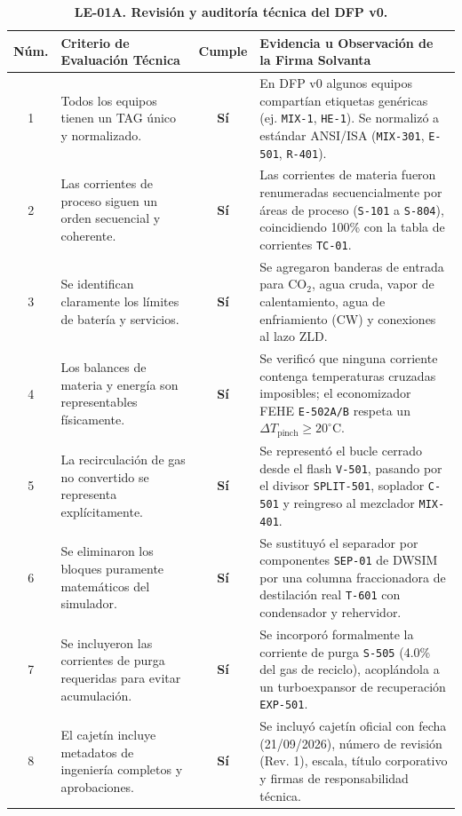 \documentclass[10pt,letterpaper]{article}
\begin{document}
\begin{table}[H]
\centering
\small
\caption{\textbf{LE-01A. Revisión y auditoría técnica del DFP v0.}} \label{tab:cuadro3}
\begin{tabularx}{\textwidth}{c p{5.5cm} c X}
\toprule
\textbf{Núm.} & \textbf{Criterio de Evaluación Técnica} & \textbf{Cumple} & \textbf{Evidencia u Observación de la Firma Solvanta} \\
\midrule
1 & Todos los equipos tienen un TAG único y normalizado. & \textbf{Sí} & En DFP v0 algunos equipos compartían etiquetas genéricas (ej. \texttt{MIX-1}, \texttt{HE-1}). Se normalizó a estándar ANSI/ISA (\texttt{MIX-301}, \texttt{E-501}, \texttt{R-401}). \\
2 & Las corrientes de proceso siguen un orden secuencial y coherente. & \textbf{Sí} & Las corrientes de materia fueron renumeradas secuencialmente por áreas de proceso (\texttt{S-101} a \texttt{S-804}), coincidiendo 100\% con la tabla de corrientes \texttt{TC-01}. \\
3 & Se identifican claramente los límites de batería y servicios. & \textbf{Sí} & Se agregaron banderas de entrada para $\text{CO}_2$, agua cruda, vapor de calentamiento, agua de enfriamiento (CW) y conexiones al lazo ZLD. \\
4 & Los balances de materia y energía son representables físicamente. & \textbf{Sí} & Se verificó que ninguna corriente contenga temperaturas cruzadas imposibles; el economizador FEHE \texttt{E-502A/B} respeta un $\Delta T_{\text{pinch}} \ge 20^\circ\text{C}$. \\
5 & La recirculación de gas no convertido se representa explícitamente. & \textbf{Sí} & Se representó el bucle cerrado desde el flash \texttt{V-501}, pasando por el divisor \texttt{SPLIT-501}, soplador \texttt{C-501} y reingreso al mezclador \texttt{MIX-401}. \\
6 & Se eliminaron los bloques puramente matemáticos del simulador. & \textbf{Sí} & Se sustituyó el separador por componentes \texttt{SEP-01} de DWSIM por una columna fraccionadora de destilación real \texttt{T-601} con condensador y rehervidor. \\
7 & Se incluyeron las corrientes de purga requeridas para evitar acumulación. & \textbf{Sí} & Se incorporó formalmente la corriente de purga \texttt{S-505} (4.0\% del gas de reciclo), acoplándola a un turboexpansor de recuperación \texttt{EXP-501}. \\
8 & El cajetín incluye metadatos de ingeniería completos y aprobaciones. & \textbf{Sí} & Se incluyó cajetín oficial con fecha (21/09/2026), número de revisión (Rev. 1), escala, título corporativo y firmas de responsabilidad técnica. \\
\bottomrule
\end{tabularx}
\end{table}
\end{document}
